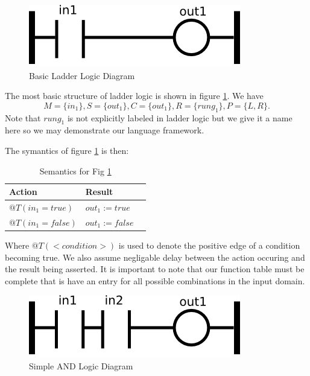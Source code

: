 \begin{figure}[htp]
    \centering
    \includegraphics[width=\imgsmall]{./images/intro_fig1.png}
    \caption{Basic Ladder Logic Diagram}
    \label{fig:intro_fig1}
\end{figure}

The most basic structure of ladder logic is shown in figure \ref{fig:intro_fig1}. 
We have 
$$M=\lbrace in_1 \rbrace, S=\lbrace out_1 \rbrace, C=\lbrace out_1 \rbrace, R=\lbrace rung_1 \rbrace, P=\lbrace L,R \rbrace.$$
Note that $rung_1$ is not explicitly labeled in ladder logic but we give it a name here
so we may demonstrate our language framework.

The symantics of figure \ref{fig:intro_fig1} is then: 
\begin{table}[htp]
    \centering
    \begin{tabular}{|l|l|l|}
        \hline
        Action & Result \\
        \hline
        $@T(in_1 = true)$ & $out_1 := true$ \\
        \hline
        $@T(in_1 = false)$ & $out_1 := false$ \\
        \hline
    \end{tabular}
    \caption{Semantics for Fig \ref{fig:intro_fig1}}
    \label{table:table_for_fig1}
\end{table}


Where $@T(<condition>)$ is used to denote the positive edge of a condition becoming true.
We also assume negligable delay between the action occuring and the result being asserted.
It is important to note that our function table must be complete that is have an entry for
all possible combinations in the input domain.

\begin{figure}[htp]
    \centering
    \includegraphics[width=\imgsmall]{./images/intro_fig2.png}
    \caption{Simple AND Logic Diagram}
    \label{fig:intro_fig2}
\end{figure}

